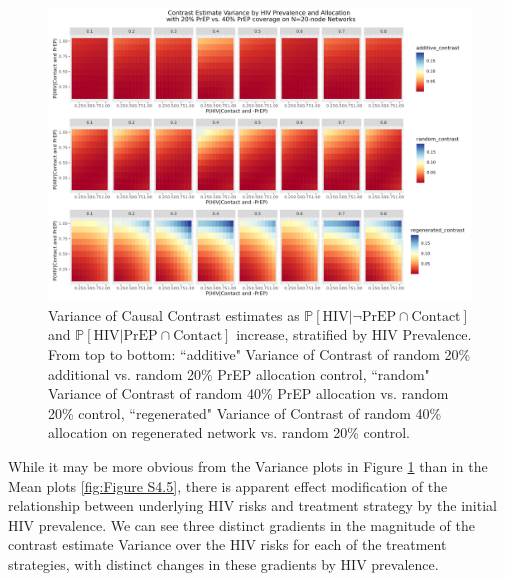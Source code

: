 \documentclass{article}
\theoremstyle{definition}
\begin{document}
\begin{figure}[H]
    \centering
    \includegraphics[width=\linewidth]{Corrected Figures/HIV Prevalence Variance Plot.png}
    \caption{Variance of Causal Contrast estimates as $\mathbb{P}\left[\text{HIV} \vert \neg \text{PrEP} \cap \text{Contact}\right]$ and $\mathbb{P}\left[\text{HIV} \vert \text{PrEP} \cap \text{Contact}\right]$ increase,  stratified by HIV Prevalence. From top to bottom: ``additive" Variance of Contrast of random 20\% additional vs. random 20\% PrEP allocation control, ``random" Variance of Contrast of random 40\% PrEP allocation vs. random 20\% control, ``regenerated" Variance of Contrast of random 40\% allocation on regenerated network vs. random 20\% control.}
    \label{fig:Figure S4.6}
\end{figure}

While it may be more obvious from the Variance plots in Figure \ref{fig:Figure S4.6} than in the Mean plots \ref{fig:Figure S4.5}, there is apparent effect modification of the relationship between underlying HIV risks and treatment strategy by the initial HIV prevalence. We can see three distinct gradients in the magnitude of the contrast estimate Variance over the HIV risks for each of the treatment strategies, with distinct changes in these gradients by HIV prevalence. 
\end{document}
